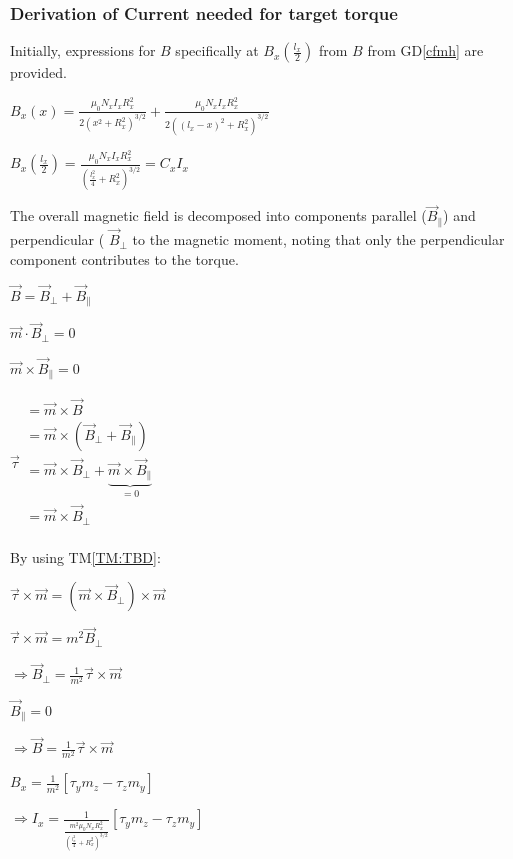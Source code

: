 \documentclass[12pt]{article}
\newcommand{\dref}[1]{GD\ref{#1}}
\newcommand{\tref}[1]{TM\ref{#1}}
\begin{document}
\subsubsection*{Derivation of Current needed for target torque}

Initially, expressions for $B$ specifically at $B_x\left( \frac{l_x}{2} \right)$ from $B$ from \dref{cfmh} are provided.

$B_x\left( x \right) =\frac{\mu _0N_xI_xR_{x}^{2}}{2\left( x^2+R_{x}^{2} \right) ^{3/2}}+\frac{\mu _0N_xI_xR_{x}^{2}}{2\left( \left( l_x-x \right) ^2+R_{x}^{2} \right) ^{3/2}}$

$B_x\left( \frac{l_x}{2} \right) =\frac{\mu _0N_xI_xR_{x}^{2}}{\left( \frac{l_{x}^{2}}{4}+R_{x}^{2} \right) ^{3/2}}=C_xI_x$

The overall magnetic field is decomposed into components parallel ($\vec{B}_{\parallel}$) and perpendicular ( $\vec{B}_{\bot}$ to the magnetic moment, noting that only the perpendicular component contributes to the torque. 

$\vec{B}=\vec{B}_{\bot}+\vec{B}_{\parallel}$

$\vec{m}\cdot \vec{B}_{\bot}=0$

$\vec{m}\times \vec{B}_{\parallel}=0$

$\vec{\tau}\begin{array}{l}
 =\vec{m}\times \vec{B}\\
 =\vec{m}\times \left( \vec{B}_{\bot}+\vec{B}_{\parallel} \right)\\
 =\vec{m}\times \vec{B}_{\bot}+\underset{=0}{\underbrace{\vec{m}\times \vec{B}_{\parallel}}}\\
 =\vec{m}\times \vec{B}_{\bot}\\
\end{array}$

By using \tref{TM:TBD}:

$\vec{\tau}\times \vec{m}=\left( \vec{m}\times \vec{B}_{\bot} \right) \times \vec{m}$

$\vec{\tau}\times \vec{m}=m^2\vec{B}_{\bot}$

$\Rightarrow \vec{B}_{\bot}=\frac{1}{m^2}\vec{\tau}\times \vec{m}$

$\vec{B}_{\parallel}=0$

$\Rightarrow \vec{B}=\frac{1}{m^2}\vec{\tau}\times \vec{m}$

$B_x=\frac{1}{m^2}\left[ \tau _ym_z-\tau _zm_y \right] $

$\Rightarrow I_x=\frac{1}{\frac{m^2\mu _0N_xR_{x}^{2}}{\left( \frac{l_{x}^{2}}{4}+R_{x}^{2} \right) ^{3/2}}}\left[ \tau _ym_z-\tau _zm_y \right] $
\end{document}
